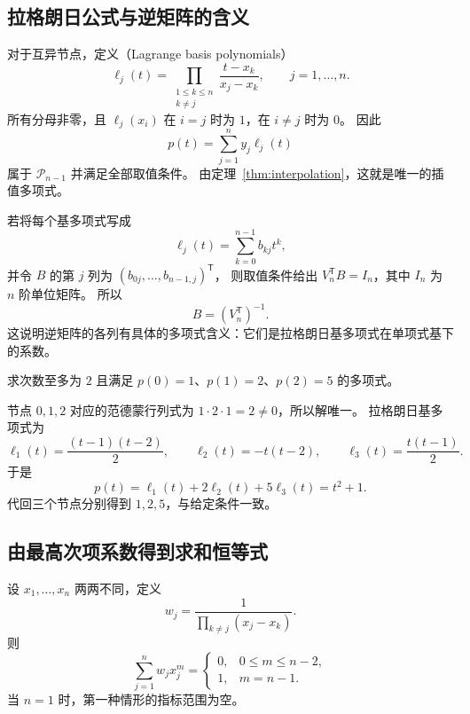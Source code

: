 \documentclass[UTF8,12pt,a4paper,fontset=fandol]{ctexart}
\begin{document}
\subsection{拉格朗日公式与逆矩阵的含义}

对于互异节点，定义（Lagrange basis polynomials）
\begin{equation}
  \ell_j(t)=\prod_{\substack{1\leq k\leq n\\k\ne j}}
  \frac{t-x_k}{x_j-x_k},\qquad j=1,\ldots,n.
  \label{eq:lagrange-basis}
\end{equation}
所有分母非零，且 $\ell_j(x_i)$ 在 $i=j$ 时为 $1$，在 $i\ne j$ 时为 $0$。
因此
\begin{equation}
  p(t)=\sum_{j=1}^n y_j\ell_j(t)
  \label{eq:lagrange-interpolation}
\end{equation}
属于 $\mathcal P_{n-1}$ 并满足全部取值条件。
由定理~\ref{thm:interpolation}，这就是唯一的插值多项式。

若将每个基多项式写成
\[
  \ell_j(t)=\sum_{k=0}^{n-1}b_{kj}t^k,
\]
并令 $B$ 的第 $j$ 列为 $(b_{0j},\ldots,b_{n-1,j})^{\mathsf T}$，
则取值条件给出 $V_n^{\mathsf T}B=I_n$，其中 $I_n$ 为 $n$ 阶单位矩阵。
所以
\[
  B=(V_n^{\mathsf T})^{-1}.
\]
这说明逆矩阵的各列有具体的多项式含义：它们是拉格朗日基多项式在单项式基下的系数。

\begin{example}[由三个取值恢复二次多项式]
求次数至多为 $2$ 且满足 $p(0)=1$、$p(1)=2$、$p(2)=5$ 的多项式。
\end{example}

\begin{solve}
节点 $0,1,2$ 对应的范德蒙行列式为 $1\cdot2\cdot1=2\ne0$，所以解唯一。
拉格朗日基多项式为
\[
  \ell_1(t)=\frac{(t-1)(t-2)}2,\qquad
  \ell_2(t)=-t(t-2),\qquad
  \ell_3(t)=\frac{t(t-1)}2.
\]
于是
\[
  p(t)=\ell_1(t)+2\ell_2(t)+5\ell_3(t)=t^2+1.
\]
代回三个节点分别得到 $1,2,5$，与给定条件一致。
\end{solve}

\subsection{由最高次项系数得到求和恒等式}

\begin{proposition}[插值权重恒等式]
\label{prop:interpolation-weights}
设 $x_1,\ldots,x_n$ 两两不同，定义
\[
  w_j=\frac{1}{\prod_{k\ne j}(x_j-x_k)}.
\]
则
\begin{equation}
  \sum_{j=1}^n w_jx_j^m
  =\begin{cases}
    0,&0\leq m\leq n-2,\\
    1,&m=n-1.
  \end{cases}
  \label{eq:interpolation-weights}
\end{equation}
当 $n=1$ 时，第一种情形的指标范围为空。
\end{proposition}
\end{document}

